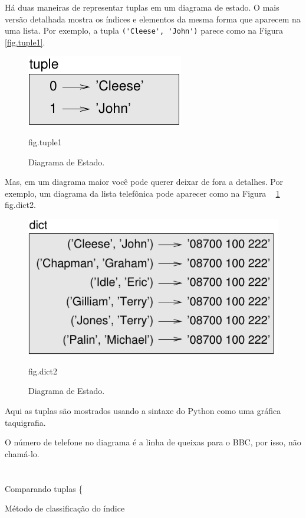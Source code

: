 \documentclass[10pt]{book}
\begin{document}
\begin{exercise}
\begin{v erbatim}
{Há duas maneiras de representar tuplas em um diagrama de estado. O mais
versão detalhada mostra os índices e elementos da mesma forma que aparecem na
uma lista. Por exemplo, a tupla \verb "('Cleese', 'John')" parece
como na Figura ~ \ref {fig.tuple1}.

\begin{figure}
\centerline
{\includegraphics[scale = 0.8] {figs/tuple1.pdf}}
\caption{Diagrama de Estado.}
\label{} fig.tuple1
\end{figure}

Mas, em um diagrama maior você pode querer deixar de fora a
detalhes. Por exemplo, um diagrama da lista telefônica pode
aparecer como na Figura ~ \ref {} fig.dict2.

\begin{figure}
\centerline
{\includegraphics[scale = 0.8] {figs/dict2.pdf}}
\caption{Diagrama de Estado.}
\label{} fig.dict2
\end{figure}

Aqui as tuplas são mostrados usando a sintaxe do Python como uma gráfica
taquigrafia.

O número de telefone no diagrama é a linha de queixas para o
BBC, por isso, não chamá-lo.



\section{} Comparando tuplas
\{} Método de classificação do índice


\end{v erbatim}
\end{exercise}
\end{document}
